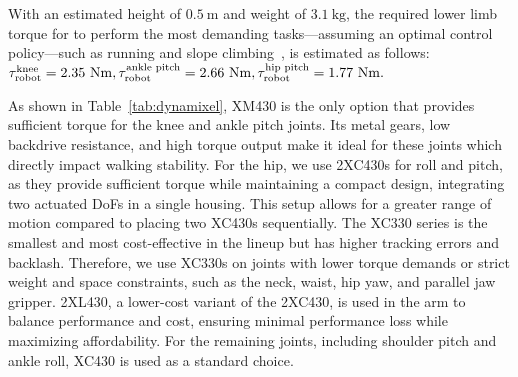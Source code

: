 With an estimated height of $0.5~\mathrm{m}$ and weight of $3.1~\mathrm{kg}$, the required lower limb torque for \system to perform the most demanding tasks—assuming an optimal control policy—such as running and slope climbing~\citep{grimmer2020human}, is estimated as follows: ${\tau}_{\text{robot}}^{\text{knee}} = 2.35~\mathrm{Nm},\space  
{\tau}_{\text{robot}}^{\text{ankle\ pitch}} = 2.66~\mathrm{Nm},\space  
{\tau}_{\text{robot}}^{\text{hip\ pitch}} = 1.77~\mathrm{Nm}.$

As shown in Table~\ref{tab:dynamixel}, XM430 is the only option that provides sufficient torque for the knee and ankle pitch joints. Its metal gears, low backdrive resistance, and high torque output make it ideal for these joints which directly impact walking stability.
For the hip, we use 2XC430s for roll and pitch, as they provide sufficient torque while maintaining a compact design, integrating two actuated DoFs in a single housing. This setup allows for a greater range of motion compared to placing two XC430s sequentially.
The XC330 series is the smallest and most cost-effective in the lineup but has higher tracking errors and backlash. Therefore, we use XC330s on joints with lower torque demands or strict weight and space constraints, such as the neck, waist, hip yaw, and parallel jaw gripper. 
2XL430, a lower-cost variant of the 2XC430, is used in the arm to balance performance and cost, ensuring minimal performance loss while maximizing affordability.
For the remaining joints, including shoulder pitch and ankle roll, XC430 is used as a standard choice.


